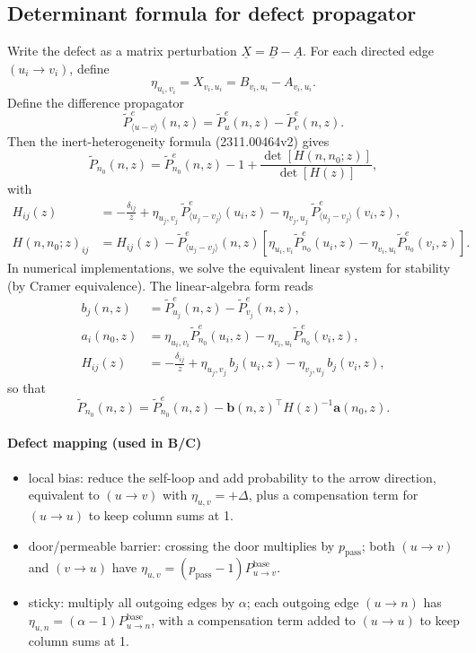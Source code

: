 \documentclass[11pt]{article}
\begin{document}
\subsection{Determinant formula for defect propagator}
Write the defect as a matrix perturbation $\underline{X}=\underline{B}-\underline{A}$. For each directed edge $(u_i\to v_i)$, define
\begin{equation}
  \eta_{u_i,v_i}=X_{v_i,u_i}=B_{v_i,u_i}-A_{v_i,u_i}.
\end{equation}
Define the difference propagator
\begin{equation}
  \tilde P^e_{\langle u-v\rangle}(n,z)=\tilde P^e_{u}(n,z)-\tilde P^e_{v}(n,z).
\end{equation}
Then the inert-heterogeneity formula (2311.00464v2) gives
\begin{equation}
  \tilde P_{n_0}(n,z)=\tilde P^e_{n_0}(n,z)-1+\frac{\det[H(n,n_0;z)]}{\det[H(z)]},
\end{equation}
with
\begin{align}
  H_{ij}(z)&=-\frac{\delta_{ij}}{z}+\eta_{u_j,v_j}\,\tilde P^e_{\langle u_j-v_j\rangle}(u_i,z)-\eta_{v_j,u_j}\,\tilde P^e_{\langle u_j-v_j\rangle}(v_i,z),\\
  H(n,n_0;z)_{ij}&=H_{ij}(z)-\tilde P^e_{\langle u_j-v_j\rangle}(n,z)\left[\eta_{u_i,v_i}\tilde P^e_{n_0}(u_i,z)-\eta_{v_i,u_i}\tilde P^e_{n_0}(v_i,z)\right].
\end{align}
In numerical implementations, we solve the equivalent linear system for stability (by Cramer equivalence).
The linear-algebra form reads
\begin{align}
  b_j(n,z)&=\tilde P^e_{u_j}(n,z)-\tilde P^e_{v_j}(n,z),\\
  a_i(n_0,z)&=\eta_{u_i,v_i}\tilde P^e_{n_0}(u_i,z)-\eta_{v_i,u_i}\tilde P^e_{n_0}(v_i,z),\\
  H_{ij}(z)&=-\frac{\delta_{ij}}{z}+\eta_{u_j,v_j}\,b_j(u_i,z)-\eta_{v_j,u_j}\,b_j(v_i,z),
\end{align}
so that
\begin{equation}
  \tilde P_{n_0}(n,z)=\tilde P^e_{n_0}(n,z)-\mathbf{b}(n,z)^\top H(z)^{-1}\mathbf{a}(n_0,z).
\end{equation}

\paragraph{Defect mapping (used in B/C)}
\begin{itemize}
  \item local bias: reduce the self-loop and add probability to the arrow direction, equivalent to $(u\to v)$ with $\eta_{u,v}=+\Delta$, plus a compensation term for $(u\to u)$ to keep column sums at 1.
  \item door/permeable barrier: crossing the door multiplies by $p_{\text{pass}}$; both $(u\to v)$ and $(v\to u)$ have $\eta_{u,v}=(p_{\text{pass}}-1)P_{u\to v}^{\text{base}}$.
  \item sticky: multiply all outgoing edges by $\alpha$; each outgoing edge $(u\to n)$ has $\eta_{u,n}=(\alpha-1)P_{u\to n}^{\text{base}}$, with a compensation term added to $(u\to u)$ to keep column sums at 1.
\end{itemize}
\end{document}
